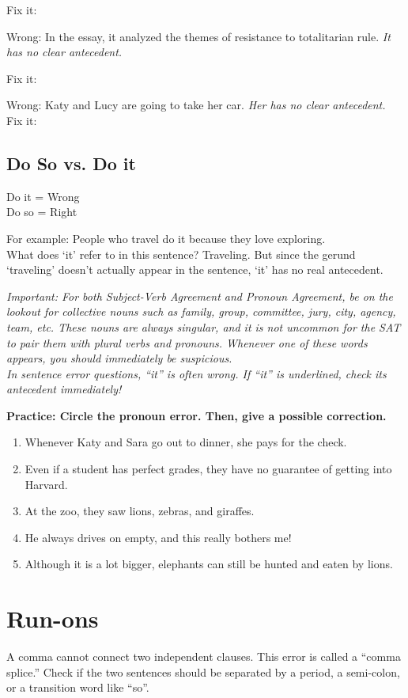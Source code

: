 \bigskip
Fix it: \hrulefill

\bigskip
Wrong: In the essay, it analyzed the themes of resistance to totalitarian rule.
\textit{It has no clear antecedent.}

\bigskip
Fix it: \hrulefill

\bigskip
Wrong: Katy and Lucy are going to take her car.
\textit{Her has no clear antecedent.}
Fix it: \hrulefill

\subsection{Do So vs. Do it}

Do it = Wrong \\
Do so = Right 

\bigskip
For example: People who travel do it because they love exploring.\\
What does `it' refer to in this sentence? Traveling. But since the gerund `traveling' doesn't actually appear in the sentence, `it' has no real antecedent.

\bigskip
\textit{Important:
For both Subject-Verb Agreement and Pronoun Agreement, be on the lookout for collective nouns such as family, group, committee, jury, city, agency, team, etc. These nouns are always singular, and it is not uncommon for the SAT to pair them with plural verbs and pronouns. Whenever one of these words appears, you should immediately be suspicious.\\
In sentence error questions, ``it'' is often wrong.  If ``it'' is underlined, check its antecedent immediately!}

\bigskip
\textbf{Practice: Circle the pronoun error. Then, give a possible correction.}
\begin{enumerate}
\item{Whenever Katy and Sara go out to dinner, she pays for the check.}
\item{Even if a student has perfect grades, they have no guarantee of getting into Harvard.}
\item{At the zoo, they saw lions, zebras, and giraffes.}
\item{He always drives on empty, and this really bothers me!}
\item{Although it is a lot bigger, elephants can still be hunted and eaten by lions.}
\end{enumerate}


\section{Run-ons}
A comma cannot connect two independent clauses.  This error is called a ``comma splice.'' Check if the two sentences should be separated by a period, a semi-colon, or a transition word like ``so''.

